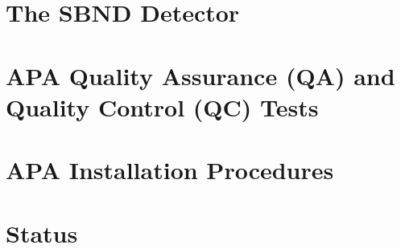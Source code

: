 \section{The SBND Detector}
\section{APA Quality Assurance (QA) and Quality Control (QC) Tests}
\section{APA Installation Procedures}
\section{Status}